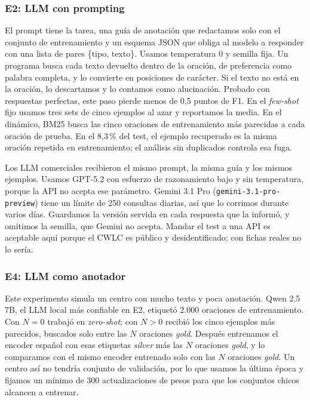 \documentclass[10pt,journal,a4paper]{IEEEtran}
\begin{document}
\subsubsection{E2: LLM con prompting}
El prompt tiene la tarea, una guía de anotación que redactamos solo con el conjunto de entrenamiento y un esquema JSON que obliga al modelo a responder con una lista de pares \{tipo, texto\}. Usamos temperatura 0 y semilla fija. Un programa busca cada texto devuelto dentro de la oración, de preferencia como palabra completa, y lo convierte en posiciones de carácter. Si el texto no está en la oración, lo descartamos y lo contamos como alucinación. Probado con respuestas perfectas, este paso pierde menos de 0,5 puntos de F1. En el \emph{few-shot} fijo usamos tres sets de cinco ejemplos al azar y reportamos la media. En el dinámico, BM25 \cite{robertson2009} busca las cinco oraciones de entrenamiento más parecidas a cada oración de prueba. En el 8,3\,\% del test, el ejemplo recuperado es la misma oración repetida en entrenamiento; el análisis sin duplicados controla esa fuga.

Los LLM comerciales recibieron el mismo prompt, la misma guía y los mismos ejemplos. Usamos GPT-5.2 con esfuerzo de razonamiento bajo y sin temperatura, porque la API no acepta ese parámetro. Gemini 3.1 Pro (\texttt{gemini-3.1-pro-preview}) tiene un límite de 250 consultas diarias, así que lo corrimos durante varios días. Guardamos la versión servida en cada respuesta que la informó, y omitimos la semilla, que Gemini no acepta. Mandar el test a una API es aceptable aquí porque el CWLC es público y desidentificado; con fichas reales no lo sería.

\subsubsection{E4: LLM como anotador}
Este experimento simula un centro con mucho texto y poca anotación. Qwen 2.5 7B, el LLM local más confiable en E2, etiquetó 2.000 oraciones de entrenamiento. Con $N=0$ trabajó en \emph{zero-shot}; con $N>0$ recibió los cinco ejemplos más parecidos, buscados solo entre las $N$ oraciones \emph{gold}. Después entrenamos el encoder español con esas etiquetas \emph{silver} más las $N$ oraciones \emph{gold}, y lo comparamos con el mismo encoder entrenado solo con las $N$ oraciones \emph{gold}. Un centro así no tendría conjunto de validación, por lo que usamos la última época y fijamos un mínimo de 300 actualizaciones de pesos para que los conjuntos chicos alcancen a entrenar.
\end{document}
